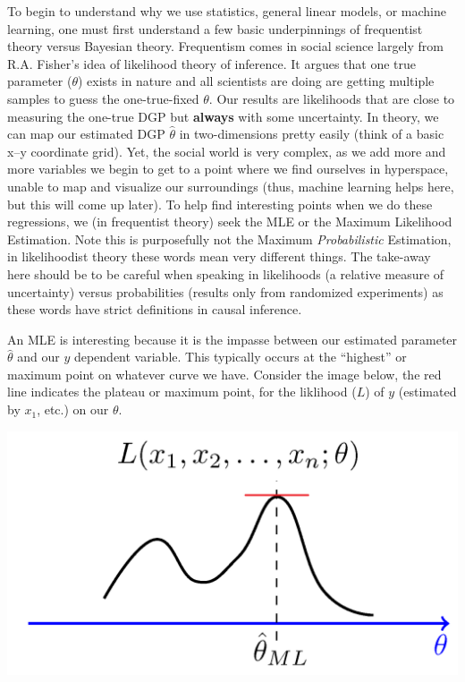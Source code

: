 \documentclass[12pt]{article}\usepackage[]{graphicx}\usepackage[]{color}
\begin{document}
\begin{flushleft}
To begin to understand why we use statistics, general linear models, or machine learning, one must first understand a few basic underpinnings of frequentist theory versus Bayesian theory. Frequentism comes in social science largely from R.A. Fisher's idea of likelihood theory of inference. It argues that one true parameter ($\theta$) exists in nature and all scientists are doing are getting multiple samples to guess the one-true-fixed $\theta$. Our results are likelihoods that are close to measuring the one-true DGP but \textbf{always} with some uncertainty. In theory, we can map our estimated DGP $\hat{\theta}$ in two-dimensions pretty easily (think of a basic x--y coordinate grid). Yet, the social world is very complex, as we add more and more variables we begin to get to a point where we find ourselves in hyperspace, unable to map and visualize our surroundings (thus, machine learning helps here, but this will come up later). To help find interesting points when we do these regressions, we (in frequentist theory) seek the MLE or the Maximum Likelihood Estimation. Note this is purposefully not the Maximum \textit{Probabilistic} Estimation, in likelihoodist theory these words mean very different things. The take-away here should be to be careful when speaking in likelihoods (a relative measure of uncertainty) versus probabilities (results only from randomized experiments) as these words have strict definitions in causal inference.

An MLE is interesting because it is the impasse between our estimated parameter $\hat{\theta}$ and our $y$ dependent variable. This typically occurs at the ``highest'' or maximum point on whatever curve we have. Consider the image below, the red line indicates the plateau or maximum point, for the liklihood ($L$) of $y$ (estimated by $x_1$, etc.) on our $\theta$.

\begin{center}
\includegraphics[scale=2]{MLEex}
\end{center}


\end{flushleft}
\end{document}
